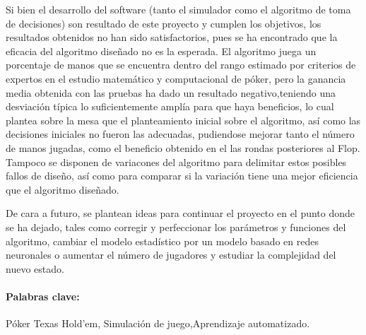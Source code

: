 Si bien el desarrollo del software (tanto el simulador como el algoritmo de toma de decisiones) son resultado de este proyecto y cumplen los objetivos, los resultados obtenidos no han sido satisfactorios, pues se ha encontrado que la eficacia del algoritmo diseñado no es la esperada.  El algoritmo juega un porcentaje de manos  que se encuentra dentro del rango estimado por criterios de expertos en el estudio matemático y computacional de póker, pero la ganancia media obtenida con las pruebas ha dado un resultado negativo,teniendo una desviación típica lo suficientemente amplía para que haya beneficios, lo cual plantea sobre la mesa que el planteamiento inicial sobre el algoritmo, así como las decisiones iniciales no fueron las adecuadas, pudiendose mejorar tanto el número de manos jugadas, como el beneficio obtenido en el las rondas posteriores al Flop. Tampoco se disponen de variacones del algoritmo para delimitar estos posibles fallos de diseño, así como para comparar si la variación tiene una mejor eficiencia que el algoritmo diseñado. 

De cara a futuro, se plantean ideas para continuar el proyecto en el punto donde se ha dejado, tales como corregir y perfeccionar los parámetros y funciones del algoritmo, cambiar el modelo estadístico por un modelo basado en redes neuronales o aumentar el número de jugadores y estudiar la complejidad del nuevo estado.


\paragraph{Palabras clave:} Póker Texas Hold'em, Simulación de juego,Aprendizaje automatizado.


